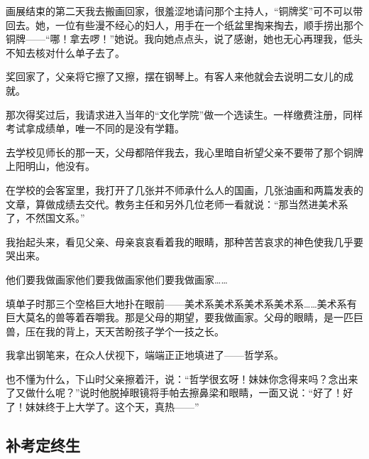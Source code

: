 \par 画展结束的第二天我去搬画回家，很羞涩地请问那个主持人，“铜牌奖”可不可以带回去。她，一位有些漫不经心的妇人，用手在一个纸盆里掏来掏去，顺手捞出那个铜牌——“哪！拿去啰！”她说。我向她点点头，说了感谢，她也无心再理我，低头不知去核对什么单子去了。
\par 奖回家了，父亲将它擦了又擦，摆在钢琴上。有客人来他就会去说明二女儿的成就。
\par 那次得奖过后，我请求进入当年的“文化学院”做一个选读生。一样缴费注册，同样考试拿成绩单，唯一不同的是没有学籍。
\par 去学校见师长的那一天，父母都陪伴我去，我心里暗自祈望父亲不要带了那个铜牌上阳明山，他没有。
\par 在学校的会客室里，我打开了几张并不师承什么人的国画，几张油画和两篇发表的文章，算做成绩去交代。教务主任和另外几位老师一看就说：“那当然进美术系了，不然国文系。”
\par 我抬起头来，看见父亲、母亲哀哀看着我的眼睛，那种苦苦哀求的神色使我几乎要哭出来。
\par 他们要我做画家他们要我做画家他们要我做画家……
\par 填单子时那三个空格巨大地扑在眼前——美术系美术系美术系美术系……美术系有巨大莫名的兽等着吞嚼我。那是父母的期望，要我做画家。父母的眼睛，是一匹巨兽，压在我的背上，天天苦盼孩子学个一技之长。
\par 我拿出钢笔来，在众人伏视下，端端正正地填进了——哲学系。
\par 也不懂为什么，下山时父亲擦着汗，说：“哲学很玄呀！妹妹你念得来吗？念出来了又做什么呢？”说时他脱掉眼镜将手帕去擦鼻梁和眼睛，一面又说：“好了！好了！妹妹终于上大学了。这个天，真热——”




\subsection{补考定终生}


